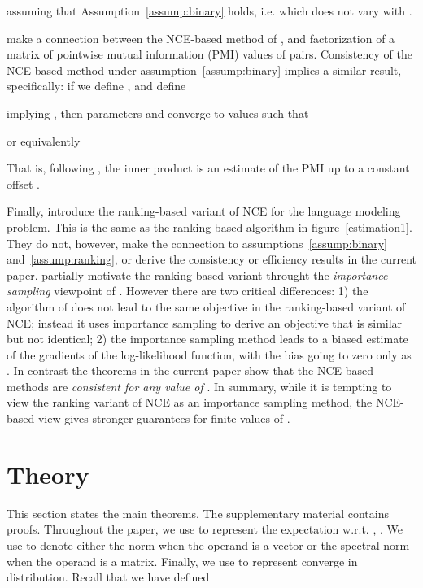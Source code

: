 \documentclass[11pt,a4paper]{article}
\begin{document}
assuming that Assumption~\ref{assump:binary} holds, i.e.  which does not vary with . 




\citet{Levy:2014:NWE} make a connection between the NCE-based method
of \cite{Mikolov:2013}, and factorization of a matrix of
pointwise mutual information (PMI) values of  pairs. 
Consistency of the NCE-based
method under assumption~\ref{assump:binary} implies a similar result,
specifically: if we define , and define

implying ,
then parameters
 and  converge to values such that

or equivalently

That is, following \cite{Levy:2014:NWE}, the
inner product  is an estimate of the PMI
up to a constant offset .

Finally, \citet{jozefowicz2016exploring} introduce the ranking-based
variant of NCE for the language modeling problem. This is 
the same as the ranking-based algorithm in figure~\ref{estimation1}.
They do not, however, make the connection to
assumptions~\ref{assump:binary} and~\ref{assump:ranking}, or derive
the consistency or efficiency results in the current paper.
\citet{jozefowicz2016exploring} partially motivate the ranking-based
variant throught the {\em importance sampling} viewpoint of
\citet{bengio2008adaptive}. However there are two critical 
differences: 1) the algorithm of \citet{bengio2008adaptive} does
not lead to the same objective  in the ranking-based
variant of NCE; instead it uses importance sampling to
derive an objective that is similar but not identical; 2) 
the importance sampling method leads to a biased estimate
of the gradients of the log-likelihood function, with the bias
going to zero only as . In contrast the
theorems in the current paper show that the NCE-based methods
are {\em consistent for any value of }. In summary, while
it is tempting to view the ranking variant of NCE as an importance
sampling method, the NCE-based view gives stronger guarantees for
finite values of .




\section{Theory}
\label{sec:theory}

This section states the main theorems. The supplementary material
contains proofs. Throughout the paper, we use 
to represent the expectation w.r.t. , . 
We use  to denote either the 
norm when the operand is a vector or the spectral norm when the
operand is a matrix. Finally, we use  to represent converge in distribution.
Recall that we have defined 
\end{document}
